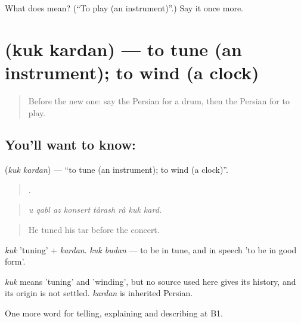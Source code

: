 \begin{tcolorbox}[breakable,colback=teal!4,colframe=teal!35!black,title={Before you move on}]
What does  mean? (\textquotedblleft{}To play (an instrument)\textquotedblright{}.) Say it once more.
\end{tcolorbox}
\section[\texorpdfstring{\fa{کوک} \fa{کردن} (kuk kardan)}{کوک کردن (kuk kardan)}]{  (kuk kardan) — to tune (an instrument); to wind (a clock)}

\label{lesson:FA-C518-kuk-kardan}



\begin{quote}
Before the new one: say the Persian for a drum, then the Persian for to play.
\end{quote}

\subsection*{You'll want to know:  }
\textbf{ } (\emph{kuk kardan}) — \textquotedblleft{}to tune (an instrument); to wind (a clock)\textquotedblright{}.

\begin{quote}
       .
\end{quote}

\begin{quote}
\emph{u qabl az konsert târash râ kuk kard.}
\end{quote}

\begin{quote}
He tuned his tar before the concert.
\end{quote}

\emph{kuk} 'tuning' + \emph{kardan}. \emph{kuk budan} — to be in tune, and in speech 'to be in good form'.

\begin{cousinweb}
\emph{kuk} means 'tuning' and 'winding', but no source used here gives its history, and its origin is not settled. \emph{kardan} is inherited Persian.
\end{cousinweb}

\begin{grammarlens}[title={What you've built}]
One more word for telling, explaining and describing at B1.
\end{grammarlens}

